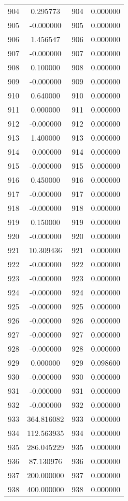 \documentclass[12pt]{article}
\begin{document}
\begin{longtable}{@{}cccc@{}}
904 & 0.295773 & 904 & 0.000000 \\
905 & -0.000000 & 905 & 0.000000 \\
906 & 1.456547 & 906 & 0.000000 \\
907 & -0.000000 & 907 & 0.000000 \\
908 & 0.100000 & 908 & 0.000000 \\
909 & -0.000000 & 909 & 0.000000 \\
910 & 0.640000 & 910 & 0.000000 \\
911 & 0.000000 & 911 & 0.000000 \\
912 & -0.000000 & 912 & 0.000000 \\
913 & 1.400000 & 913 & 0.000000 \\
914 & -0.000000 & 914 & 0.000000 \\
915 & -0.000000 & 915 & 0.000000 \\
916 & 0.450000 & 916 & 0.000000 \\
917 & -0.000000 & 917 & 0.000000 \\
918 & -0.000000 & 918 & 0.000000 \\
919 & 0.150000 & 919 & 0.000000 \\
920 & -0.000000 & 920 & 0.000000 \\
921 & 10.309436 & 921 & 0.000000 \\
922 & -0.000000 & 922 & 0.000000 \\
923 & -0.000000 & 923 & 0.000000 \\
924 & -0.000000 & 924 & 0.000000 \\
925 & -0.000000 & 925 & 0.000000 \\
926 & -0.000000 & 926 & 0.000000 \\
927 & -0.000000 & 927 & 0.000000 \\
928 & -0.000000 & 928 & 0.000000 \\
929 & 0.000000 & 929 & 0.098600 \\
930 & -0.000000 & 930 & 0.000000 \\
931 & -0.000000 & 931 & 0.000000 \\
932 & -0.000000 & 932 & 0.000000 \\
933 & 364.816082 & 933 & 0.000000 \\
934 & 112.563935 & 934 & 0.000000 \\
935 & 286.045229 & 935 & 0.000000 \\
936 & 87.130976 & 936 & 0.000000 \\
937 & 200.000000 & 937 & 0.000000 \\
938 & 400.000000 & 938 & 0.000000 \\

\end{longtable}
\end{document}
